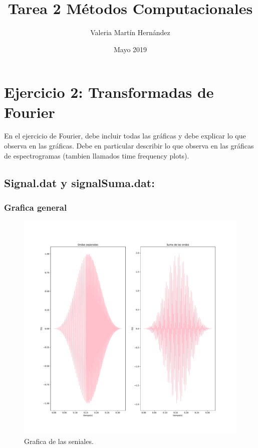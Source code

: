 \documentclass[11pt,letterpaper]{exam}
\title{Tarea 2 Métodos Computacionales}
\author{Valeria Martín Hernández}
\date{Mayo 2019}
\begin{document}
\maketitle
\newpage


\section{Ejercicio 2: Transformadas de Fourier}
En el ejercicio de Fourier, debe incluir todas las gráficas y debe explicar lo que observa en las gráficas. Debe en particular describir lo que observa en las gráficas de espectrogramas (tambien llamados time frequency plots). 
\subsection{Signal.dat y signalSuma.dat:}
\subsubsection{Grafica general}
\begin{figure}[H]
    \centering
    \includegraphics[width=1\textwidth]{signals.pdf}
    \caption{Grafica de las seniales.}
    \label{fig:my_label}
\end{figure}
\end{document}
